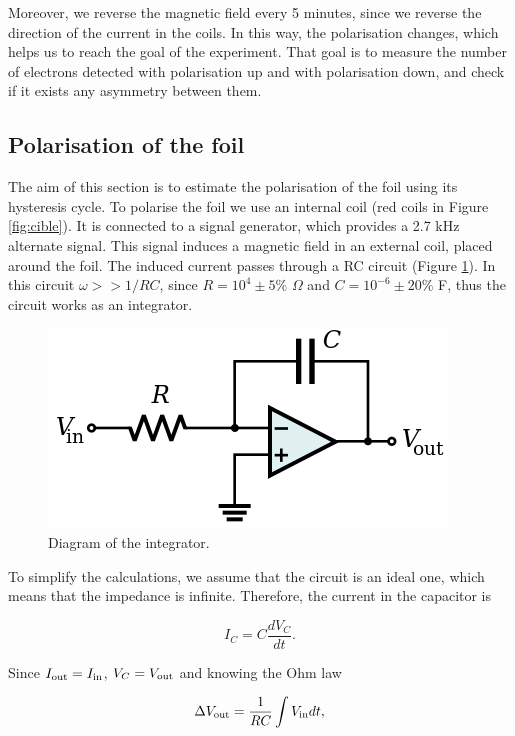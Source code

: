 \documentclass[10pt,swedish, openany]{book}
\begin{document}
Moreover, we reverse the magnetic field every 5 minutes, since we reverse the direction of the current in the coils. In this way, the polarisation changes, which helps us to reach the goal of the experiment. That goal is to measure the number of electrons detected with polarisation up and with polarisation down, and check if it exists any asymmetry between them.

\subsection{Polarisation of the foil}\label{polfoil}

The aim of this section is to estimate the polarisation of the foil using its hysteresis cycle. To polarise the foil we use an internal coil (red coils in Figure \ref{fig:cible}). It is connected to a signal generator, which provides a 2.7 kHz alternate signal. This signal induces a magnetic field in an external coil, placed around the foil. The induced current passes through a RC circuit (Figure \ref{fig:int}). In this circuit $\omega >>1/RC$, since $R = 10^4 \pm 5\%$ $\Omega$ and $ C = 10^{-6} \pm 20\%$ F, thus the circuit works as an integrator. 

\begin{figure}[H]
\includegraphics[scale=0.3]{integrator.png}
\centering
\caption{Diagram of the integrator.}
\label{fig:int}
\end{figure}

To simplify the calculations, we assume that the circuit is an ideal one, which means that the impedance is infinite. Therefore, the current in the capacitor is 

\begin{equation}
    I_C = C \frac{dV_C}{dt}.
\end{equation}

Since $I_{\rm out}=I_{\rm in}$, $V_C = V_{\rm out}$ and knowing the Ohm law

\begin{equation}
    \Delta V_{\rm out}= \frac{1}{R C} \int V_{\rm in} dt,
\end{equation}
\end{document}
